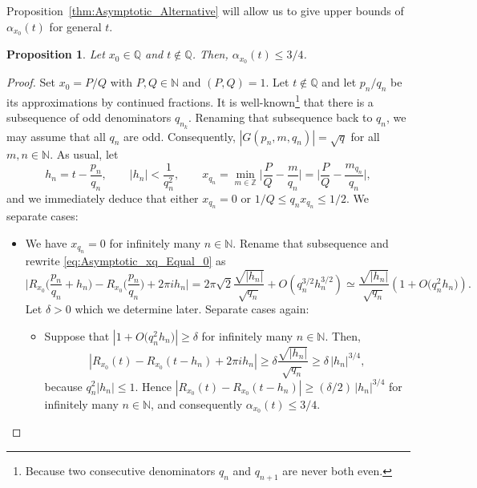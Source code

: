 \documentclass[11pt,reqno]{amsart}
\newtheorem{prop}[thm]{Proposition}
\theoremstyle{definition}
\begin{document}
Proposition~\ref{thm:Asymptotic_Alternative} 
will allow us to give upper bounds of $\alpha_{x_0}(t)$ for general $t$. 

\begin{prop}\label{thm:UpperBound34}
Let $x_0 \in \mathbb Q$ and $t \not\in \mathbb Q$. Then, $\alpha_{x_0}(t) \leq  3/4$. 
\end{prop}
\begin{proof}
Set $x_0 = P/Q$ with $P,Q \in \mathbb N$ and $(P,Q) = 1$. 
Let $t \not\in \mathbb Q$ and let $p_n/q_n$ be its approximations by continued fractions. 
It is well-known\footnote{Because two consecutive denominators $q_n$ and $q_{n+1}$ are never both even.} that there is a subsequence of odd denominators $q_{n_k}$. 
Renaming that subsequence back to $q_n$, we may assume that all $q_n$ are odd. 
Consequently, $|G(p_n, m, q_n)| = \sqrt{q}$ for all $m, n \in \mathbb N$. 
As usual, let 
\begin{equation}
h_n =  t - \frac{p_n}{q_n}, 
\qquad|h_n| < \frac{1}{q_n^2}, 
\qquad x_{q_n} = \min_{m \in \mathbb Z} \Big| \frac{P}{Q} - \frac{m}{q_n} \Big| = \Big| \frac{P}{Q} - \frac{m_{q_n}}{q_n} \Big|,
\end{equation}
and we immediately deduce that either $x_{q_n} = 0$ or $1/Q \leq q_n x_{q_n} \leq 1/2$. 
We separate cases:
\begin{itemize}
	\item[\textbf{Case 1}] We have $x_{q_n} = 0$ for infinitely many $n \in \mathbb N$. 
	Rename that subsequence and rewrite \eqref{eq:Asymptotic_xq_Equal_0} as 
	\begin{equation}\label{eq:Asymptotic_Case_1}
\Big| R_{x_0} \Big( \frac{p_n}{q_n} + h_n \Big)  - R_{x_0}\Big( \frac{p_n}{q_n} \Big) + 2\pi i h_n   \Big| 
 = 2\pi \sqrt{2} \frac{\sqrt{|h_n|}}{\sqrt{q_n}}  + O\left( q_n^{3/2} h_n^{3/2}  \right) 
 \simeq \frac{\sqrt{|h_n|}}{\sqrt{q_n}} \left(  1 + O\big( q_n^2 h_n \big) \right).
\end{equation}
Let $\delta > 0$ which we determine later. Separate cases again:
\begin{itemize}
	\item[\textbf{Case 1.1.}] Suppose that $\left|  1 + O\big( q_n^2 h_n \big) \right| \geq \delta$ for infinitely many $n \in \mathbb N$. 
	Then, 
	\begin{equation}
	\left| R_{x_0} (t) - R_{x_0}( t - h_n ) + 2\pi i h_n   \right| 
	\geq \delta \frac{\sqrt{|h_n|}}{\sqrt{q_n}}  
	\geq \delta \, |h_n|^{3/4}, 
	\end{equation}
	because $q_n^2 |h_n| \leq 1$. 
	Hence $| R_{x_0} (t) - R_{x_0}( t - h_n )| \geq (\delta/2) \, |h_n|^{3/4}$ for infinitely many $n \in \mathbb N$,
	and consequently $\alpha_{x_0}(t) \leq 3/4$. 
	

\end{itemize}
\end{itemize}
\end{proof}
\end{document}
